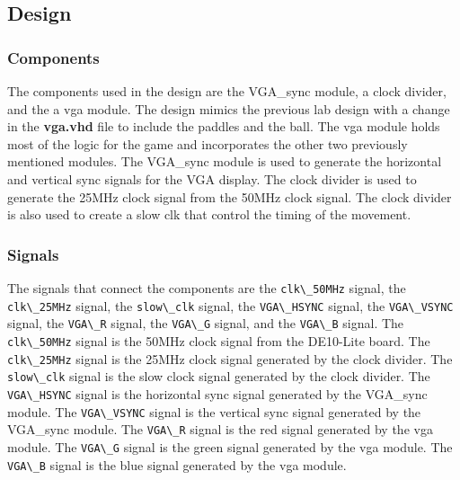 \documentclass{article}
\newcommand{\code}[1]{\lstinline|#1|}
\begin{document}
\subsection*{Design}
\subsubsection*{Components}
The components used in the design are the VGA\_sync module, a clock divider, and the a vga module. The design mimics the previous lab design with a change in the \textbf{vga.vhd} file to include the paddles and the ball. The vga module holds most of the logic for the game and incorporates the other two previously mentioned modules. The VGA\_sync module is used to generate the horizontal and vertical sync signals for the VGA display. The clock divider is used to generate the 25MHz clock signal from the 50MHz clock signal. The clock divider is also used to create a slow clk that control the timing of the movement.

\subsubsection*{Signals}
The signals that connect the components are the \code{clk\_50MHz} signal, the \code{clk\_25MHz} signal, the \code{slow\_clk} signal, the \code{VGA\_HSYNC} signal, the \code{VGA\_VSYNC} signal, the \code{VGA\_R} signal, the \code{VGA\_G} signal, and the \code{VGA\_B} signal. The \code{clk\_50MHz} signal is the 50MHz clock signal from the DE10-Lite board. The \code{clk\_25MHz} signal is the 25MHz clock signal generated by the clock divider. The \code{slow\_clk} signal is the slow clock signal generated by the clock divider. The \code{VGA\_HSYNC} signal is the horizontal sync signal generated by the VGA\_sync module. The \code{VGA\_VSYNC} signal is the vertical sync signal generated by the VGA\_sync module. The \code{VGA\_R} signal is the red signal generated by the vga module. The \code{VGA\_G} signal is the green signal generated by the vga module. The \code{VGA\_B} signal is the blue signal generated by the vga module. 
\end{document}
